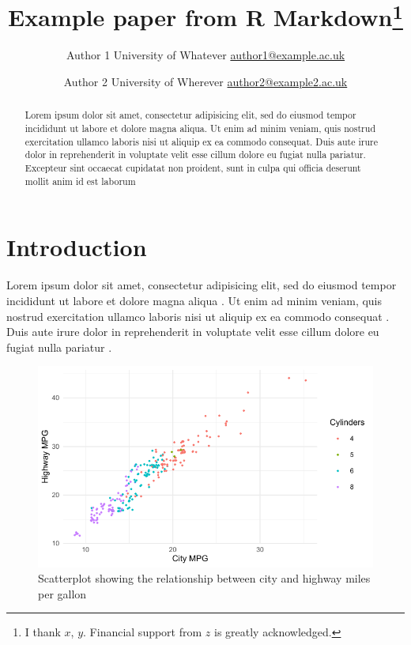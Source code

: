 \documentclass[11pt,article,oneside]{memoir}
\title{\bigskip \bigskip Example paper from R Markdown\thanks{I thank
\(x\), \(y\). Financial support from \(z\) is greatly acknowledged.}}
\author{
  \large Author 1 \newline
  \footnotesize University of Whatever \newline
  \footnotesize \url{author1@example.ac.uk}\vspace*{1.1em}\newline
    \and
  \large Author 2 \newline
  \footnotesize University of Wherever \newline
  \footnotesize \url{author2@example2.ac.uk}\vspace*{1.1em}\newline
  }
\date{}
\let\normalunderbracket=\underbracket
\let\normaloverbracket=\overbracket
\providecommand{\keywords}[1]{\small{\sffamily{\textbf{\textit{Keywords---}}#1 \vskip 3em}}}
\newcommand{\published}[1]{%
   \gdef\puB{#1}}
\newcommand{\puB}{}
\begin{document}
\let\underbracket=\normalunderbracket
\let\overbracket=\normaloverbracket

\pagestyle{athgit}

\published{\textbf{06 February, 2022} \qquad Working
paper. \\ {\tiny Access the code at
\url{https://github.com/ygalanak/DataAnalysisTemplate}}}

\maketitle


\begin{abstract}
\noindent Lorem ipsum dolor sit amet, consectetur adipisicing elit, sed
do eiusmod tempor incididunt ut labore et dolore magna aliqua. Ut enim
ad minim veniam, quis nostrud exercitation ullamco laboris nisi ut
aliquip ex ea commodo consequat. Duis aute irure dolor in reprehenderit
in voluptate velit esse cillum dolore eu fugiat nulla pariatur.
Excepteur sint occaecat cupidatat non proident, sunt in culpa qui
officia deserunt mollit anim id est laborum
\bigskip
\end{abstract}

\keywords{k1; k2; k3}




\hypertarget{introduction}{%
\section{Introduction}\label{introduction}}

Lorem ipsum dolor sit amet, consectetur adipisicing elit, sed do eiusmod
tempor incididunt ut labore et dolore magna aliqua
\autocite{HeissKelley:2017}. Ut enim ad minim veniam, quis nostrud
exercitation ullamco laboris nisi ut aliquip ex ea commodo consequat
\autocite{KeckSikkink:1998}. Duis aute irure dolor in reprehenderit in
voluptate velit esse cillum dolore eu fugiat nulla pariatur
\autocite{Heiss:2019}.

\begin{figure}
\hypertarget{fig:mpg-plot}{%
\centering
\includegraphics{./figs-tbls/mpg-plot.pdf}
\caption{Scatterplot showing the relationship between city and highway
miles per gallon}\label{fig:mpg-plot}
}
\end{figure}
\end{document}
